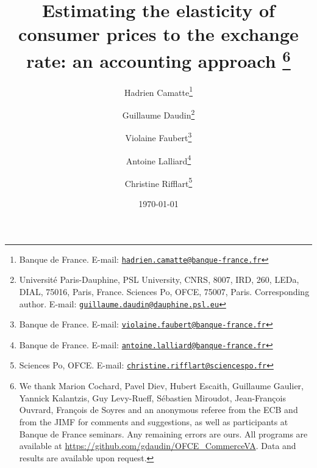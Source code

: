 \documentclass[11pt,a4paper]{paper} %
\newcommand{\email}[1]{\href{mailto:#1}{\nolinkurl{#1}}}
\begin{document}
\title{Estimating the elasticity of consumer prices to the exchange rate: an accounting approach	\thanks{We thank Marion Cochard, Pavel Diev, Hubert Escaith, Guillaume Gaulier, Yannick Kalantzis, Guy Levy-Rueff, Sébastien Miroudot, Jean-François Ouvrard, François de Soyres and an anonymous referee from the ECB and from the JIMF for comments and suggestions, as well as participants at Banque de France seminars. Any remaining errors are ours. All programs are available at \url{https://github.com/gdaudin/OFCE_CommerceVA}. Data and results are available upon request.}\\
\vspace{1cm}
}
\vspace{1cm}
\date{\today}
\author{
	Hadrien Camatte\thanks{Banque de France. E-mail: \email{hadrien.camatte@banque-france.fr}}
	\and
	Guillaume Daudin\thanks{Université Paris-Dauphine, PSL University, CNRS, 8007, IRD, 260, LEDa, DIAL, 75016, Paris, France. Sciences Po, OFCE, 75007, Paris. Corresponding author. E-mail: \email{guillaume.daudin@dauphine.psl.eu}}
	\and
	Violaine Faubert\thanks{Banque de France. E-mail: \email{violaine.faubert@banque-france.fr}}
	\and
	Antoine Lalliard\thanks{Banque de France. E-mail: \email{antoine.lalliard@banque-france.fr}}
	\and
	Christine Rifflart\thanks{Sciences Po, OFCE. E-mail: \email{christine.rifflart@sciencespo.fr}}
}
\maketitle

\end{document}
